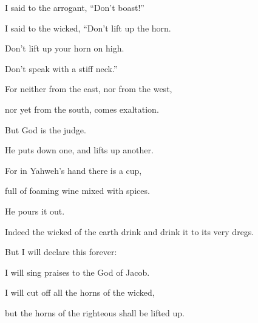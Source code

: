 {\Q {}I said to the arrogant, “Don’t boast!”
\par }{\QB I said to the wicked, “Don’t lift up the horn.
\par }{\Q {}Don’t lift up your horn on high.
\par }{\QB Don’t speak with a stiff neck.”
\par }{\Q {}For neither from the east, nor from the west,
\par }{\QB nor yet from the south, comes exaltation.
\par }{\Q {}But God is the judge.
\par }{\QB He puts down one, and lifts up another.
\par }{\Q {}For in Yahweh’s hand there is a cup,
\par }{\QB full of foaming wine mixed with spices.
\par }{\Q He pours it out.
\par }{\QB Indeed the wicked of the earth drink and drink it to its very dregs.
\par }{\BB \par }{\Q {}But I will declare this forever:
\par }{\QB I will sing praises to the God of Jacob.
\par }{\Q {}I will cut off all the horns of the wicked,
\par }{\QB but the horns of the righteous shall be lifted up.
\par }{\BB \par }
